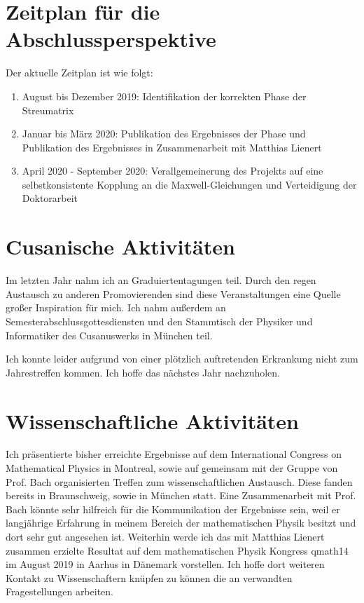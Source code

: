 \documentclass[a4paper,12pt]{article}
\begin{document}
\section{Zeitplan für die Abschlussperspektive}

Der aktuelle Zeitplan ist wie folgt:

\begin{enumerate}
\item August bis Dezember 2019: Identifikation der korrekten Phase der Streumatrix
\item Januar bis März 2020: Publikation des Ergebnisses der Phase und Publikation des Ergebnisses in Zusammenarbeit mit Matthias Lienert
\item April 2020 - September 2020:  Verallgemeinerung des Projekts auf eine selbstkonsistente Kopplung an die Maxwell-Gleichungen und Verteidigung der Doktorarbeit
\end{enumerate}





\section{Cusanische Aktivitäten}

Im letzten Jahr nahm ich an Graduiertentagungen teil. Durch den regen Austausch zu anderen Promovierenden sind diese Veranstaltungen eine Quelle großer
Inspiration für mich. Ich nahm außerdem an Semesterabschlussgottesdiensten und den Stammtisch der Physiker und Informatiker des Cusanuswerks in München teil.

Ich konnte leider aufgrund von einer plötzlich auftretenden Erkrankung nicht zum Jahrestreffen kommen. Ich hoffe das nächstes Jahr nachzuholen.

\section{Wissenschaftliche Aktivitäten}

Ich präsentierte bisher erreichte Ergebnisse auf dem International Congress on Mathematical Physics in Montreal, sowie auf gemeinsam mit der Gruppe von Prof. Bach 
organisierten Treffen zum wissenschaftlichen Austausch. Diese fanden bereits in Braunschweig, sowie in München statt. Eine Zusammenarbeit mit Prof. Bach könnte
sehr hilfreich für die Kommunikation der Ergebnisse sein, weil er langjährige Erfahrung in meinem Bereich der mathematischen Physik besitzt und dort sehr gut angesehen ist.
Weiterhin werde ich das mit Matthias Lienert zusammen erzielte Resultat auf dem mathematischen Physik Kongress qmath14 im August 2019 in Aarhus 
in Dänemark vorstellen. Ich hoffe dort 
weiteren Kontakt zu Wissenschaftern knüpfen zu können die an verwandten Fragestellungen arbeiten.
\end{document}
